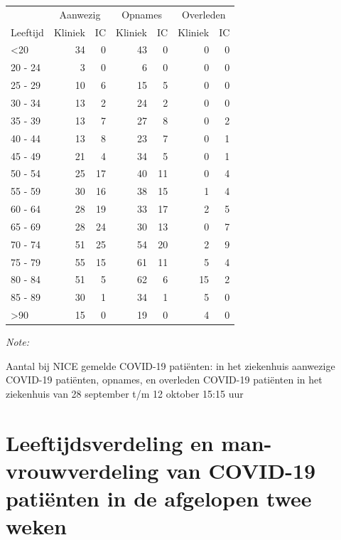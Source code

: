 \documentclass[
  english,
  man,floatsintext]{apa6}
\begin{document}
\begin{table}
\centering\begingroup\fontsize{10}{12}\selectfont

\begin{threeparttable}
\begin{tabular}{lrrrrrr}
\toprule
\multicolumn{1}{c}{ } & \multicolumn{2}{c}{Aanwezig} & \multicolumn{2}{c}{Opnames} & \multicolumn{2}{c}{Overleden} \\
\cmidrule(l{3pt}r{3pt}){2-3} \cmidrule(l{3pt}r{3pt}){4-5} \cmidrule(l{3pt}r{3pt}){6-7}
Leeftijd & Kliniek & IC & Kliniek & IC & Kliniek & IC\\
\midrule
<20 & 34 & 0 & 43 & 0 & 0 & 0\\
20 - 24 & 3 & 0 & 6 & 0 & 0 & 0\\
25 - 29 & 10 & 6 & 15 & 5 & 0 & 0\\
30 - 34 & 13 & 2 & 24 & 2 & 0 & 0\\
35 - 39 & 13 & 7 & 27 & 8 & 0 & 2\\
40 - 44 & 13 & 8 & 23 & 7 & 0 & 1\\
45 - 49 & 21 & 4 & 34 & 5 & 0 & 1\\
50 - 54 & 25 & 17 & 40 & 11 & 0 & 4\\
55 - 59 & 30 & 16 & 38 & 15 & 1 & 4\\
60 - 64 & 28 & 19 & 33 & 17 & 2 & 5\\
65 - 69 & 28 & 24 & 30 & 13 & 0 & 7\\
70 - 74 & 51 & 25 & 54 & 20 & 2 & 9\\
75 - 79 & 55 & 15 & 61 & 11 & 5 & 4\\
80 - 84 & 51 & 5 & 62 & 6 & 15 & 2\\
85 - 89 & 30 & 1 & 34 & 1 & 5 & 0\\
>90 & 15 & 0 & 19 & 0 & 4 & 0\\
\bottomrule
\end{tabular}
\begin{tablenotes}
\item \textit{Note: } 
\item Aantal bij NICE gemelde COVID-19 patiënten: in het ziekenhuis aanwezige COVID-19 patiënten, opnames, en overleden COVID-19 patiënten in het ziekenhuis van 28 september t/m 12 oktober 15:15 uur
\end{tablenotes}
\end{threeparttable}
\endgroup{}
\end{table}

\newpage

\hypertarget{leeftijdsverdeling-en-man-vrouwverdeling-van-covid-19-patiuxebnten-in-de-afgelopen-twee-weken}{%
\section{Leeftijdsverdeling en man-vrouwverdeling van COVID-19 patiënten in de afgelopen twee weken}\label{leeftijdsverdeling-en-man-vrouwverdeling-van-covid-19-patiuxebnten-in-de-afgelopen-twee-weken}}
\end{document}

